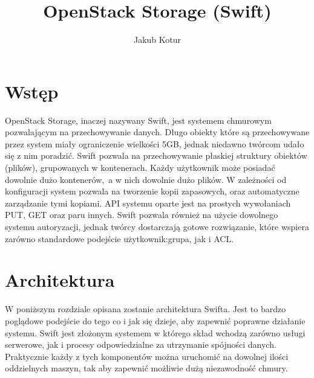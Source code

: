 


\title{OpenStack Storage (Swift)}
\author{Jakub Kotur}



\maketitle

\section{Wstęp}

\nocite{openstack}

OpenStack Storage, inaczej nazywany Swift, jest systemem chmurowym pozwalającym na przechowywanie danych. Długo obiekty które są przechowywane przez system miały ograniczenie wielkości 5GB, jednak niedawno twórcom udało się z nim poradzić. Swift pozwala na przechowywanie płaskiej struktury obiektów (plików), grupowanych w kontenerach. Każdy użytkownik może posiadać dowolnie dużo kontenerów,~a w nich dowolnie dużo plików. W zależności od konfiguracji system pozwala na tworzenie kopii zapasowych, oraz automatyczne zarządzanie tymi kopiami. API systemu oparte jest na prostych wywołaniach PUT, GET oraz paru innych. Swift pozwala również na użycie dowolnego systemu autoryzacji, jednak twórcy dostarczają gotowe rozwiązanie, które wspiera zarówno standardowe podejście użytkownik:grupa, jak i ACL.



\section{Architektura}\label{sec:architektura}

W poniższym rozdziale opisana zostanie architektura Swifta. Jest to bardzo poglądowe podejście do tego co i jak się dzieje, aby zapewnić poprawne działanie systemu. Swift jest złożonym systemem w którego skład wchodzą zarówno usługi serwerowe, jak i procesy odpowiedzialne za utrzymanie spójności danych. Praktycznie każdy z tych komponentów można uruchomić na dowolnej ilości oddzielnych maszyn, tak aby zapewnić możliwie dużą niezawodność chmury.

